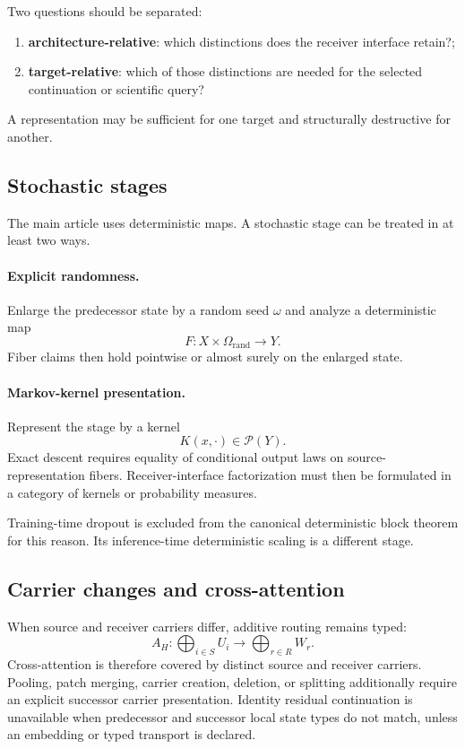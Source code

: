 Two questions should be separated:
\begin{enumerate}[label=(\roman*)]
\item \textbf{architecture-relative}: which distinctions does the receiver interface retain?;
\item \textbf{target-relative}: which of those distinctions are needed for the selected continuation or scientific query?
\end{enumerate}
A representation may be sufficient for one target and structurally destructive for another.

\subsection{Stochastic stages}

The main article uses deterministic maps. A stochastic stage can be treated in at least two ways.

\paragraph{Explicit randomness.}
Enlarge the predecessor state by a random seed $\omega$ and analyze a deterministic map
\[
F:X\times\Omega_{\mathrm{rand}}\to Y.
\]
Fiber claims then hold pointwise or almost surely on the enlarged state.

\paragraph{Markov-kernel presentation.}
Represent the stage by a kernel
\[
K(x,\cdot)\in\mathcal P(Y).
\]
Exact descent requires equality of conditional output laws on source-representation fibers. Receiver-interface factorization must then be formulated in a category of kernels or probability measures.

Training-time dropout is excluded from the canonical deterministic block theorem for this reason. Its inference-time deterministic scaling is a different stage.

\subsection{Carrier changes and cross-attention}

When source and receiver carriers differ, additive routing remains typed:
\[
A_H:
\bigoplus_{i\in S}U_i
\to
\bigoplus_{r\in R}W_r.
\]
Cross-attention is therefore covered by distinct source and receiver carriers. Pooling, patch merging, carrier creation, deletion, or splitting additionally require an explicit successor carrier presentation. Identity residual continuation is unavailable when predecessor and successor local state types do not match, unless an embedding or typed transport is declared.

